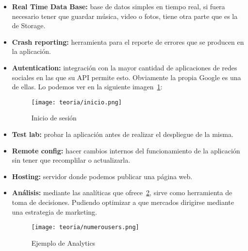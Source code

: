 \begin{itemize}
	\item \textbf{Real Time Data Base:} base de datos simples en tiempo real, si fuera necesario tener que guardar música, video o fotos, tiene otra parte que es la de Storage.
	\item \textbf{Crash reporting:} herramienta para el reporte de errores que se producen en la aplicación.
	\item \textbf{Autentication:} integración con la mayor cantidad de aplicaciones de redes sociales en las que su API permite esto. Obviamente la propia Google es una de ellas. Lo podemos ver en la siguiente imagen~\ref{fig:inicio}:
	\begin{figure}[H]
		\centering
		\texttt{[image: teoria/inicio.png]}
		\caption{Inicio de sesión}\label{fig:inicio}
	\end{figure}
	\item \textbf{Test lab:} probar la aplicación antes de realizar el despliegue de la misma.
	\item \textbf{Remote config:} hacer cambios internos del funcionamiento de la aplicación sin tener que recomplilar o actualizarla.
	\item \textbf{Hosting:} servidor donde podemos publicar una página web.
	\item \textbf{Análisis:} mediante las analíticas que ofrece~\ref{fig:numerousers}, sirve como herramienta de toma de decisiones. Pudiendo optimizar a que mercados dirigirse mediante una estrategia de marketing.
	\begin{figure}[H]
		\centering
		\texttt{[image: teoria/numerousers.png]}
		\caption{Ejemplo de Analytics}\label{fig:numerousers}
	\end{figure}
\end{itemize}
